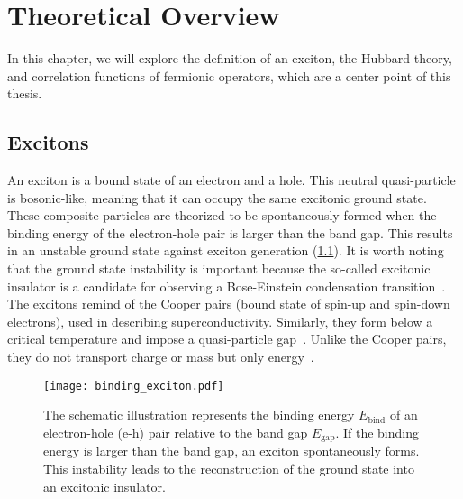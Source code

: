 
\chapter{Theoretical Overview}
\label{sec:theory}
\newcommand{\todo}[1]{\textbf{\color{red}TODO: #1}}

In this chapter, we will explore the definition of an exciton, the Hubbard theory, and correlation functions of fermionic operators, which are a center point of this thesis.

\section{Excitons}
An exciton is a bound state of an electron and a hole. This neutral quasi-particle is bosonic-like, meaning that it can occupy the same excitonic ground state. These composite particles are theorized to be spontaneously formed when the binding energy of the electron-hole pair is larger than the band gap. This results in an unstable ground state against exciton generation (\cref{fig:exciton_gap}). It is worth noting that the ground state instability is important because the so-called excitonic insulator is a candidate for observing a Bose-Einstein condensation transition~\cite{grossnev}. The excitons remind of the Cooper pairs (bound state of spin-up and spin-down electrons), used in describing superconductivity. Similarly, they form below a critical temperature and impose a quasi-particle gap~\cite{ctubes}. Unlike the Cooper pairs, they do not transport charge or mass but only energy~\cite{grossnev}. 
\begin{figure}[htbp]
    \centerline{\texttt{[image: binding\_exciton.pdf]}}
    \caption{The schematic illustration represents the binding energy $E_{\mathrm{bind}}$ of an electron-hole (e-h) pair relative to the band gap $E_{\mathrm{gap}}$. If the binding energy is larger than the band gap, an exciton spontaneously forms. This instability leads to the reconstruction of the ground state into an excitonic insulator.}
    \label{fig:exciton_gap}
\end{figure}

